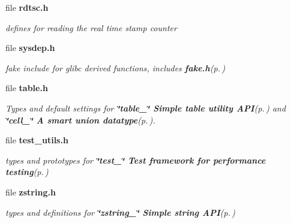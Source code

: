 \begin{CompactItemize}
\item 
file {\bf rdtsc.h}
\begin{CompactList}\small\item\em defines for reading the real time stamp counter \item\end{CompactList}

\item 
file {\bf sysdep.h}
\begin{CompactList}\small\item\em fake include for glibc derived functions, includes {\bf fake.h}{\rm (p.\,\pageref{fake_8h})} \item\end{CompactList}

\item 
file {\bf table.h}
\begin{CompactList}\small\item\em Types and default settings for {\bf \char`\"{}table\_\-\char`\"{} Simple table utility API}{\rm (p.\,\pageref{group__simple__table})} and {\bf \char`\"{}cell\_\-\char`\"{} A smart union datatype}{\rm (p.\,\pageref{group__table__cell})}. \item\end{CompactList}

\item 
file {\bf test\_\-utils.h}
\begin{CompactList}\small\item\em types and prototypes for {\bf \char`\"{}test\_\-\char`\"{} Test framework for performance testing}{\rm (p.\,\pageref{group__test})} \item\end{CompactList}

\item 
file {\bf zstring.h}
\begin{CompactList}\small\item\em types and definitions for {\bf \char`\"{}zstring\_\-\char`\"{} Simple string API}{\rm (p.\,\pageref{group__zstring})} \item\end{CompactList}

\end{CompactItemize}
